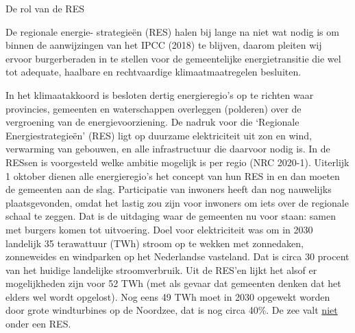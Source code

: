 \begin{voorstel}{De rol van de RES}

\begin{samenvatting}
De regionale energie- strategieën (RES) halen bij lange na niet wat nodig is om binnen de aanwijzingen van het IPCC (2018) te blijven, daarom pleiten wij ervoor burgerberaden in te stellen voor de gemeentelijke energietransitie die wel tot adequate, haalbare en rechtvaardige klimaatmaatregelen besluiten.
\end{samenvatting}

\begin{uitdaging}
In het klimaatakkoord is besloten dertig energieregio’s op te richten waar provincies, gemeenten en waterschappen overleggen (polderen) over de vergroening van de energievoorziening. De nadruk voor die ‘Regionale Energiestrategieën’ (RES) ligt op duurzame elektriciteit uit zon en wind, verwarming van gebouwen, en alle infrastructuur die daarvoor nodig is. In de RESsen is voorgesteld welke ambitie mogelijk is per regio (NRC 2020-1). Uiterlijk 1 oktober dienen alle energieregio’s het concept van hun RES in en dan moeten de gemeenten aan de slag. Participatie van inwoners heeft dan nog nauwelijks plaatsgevonden, omdat het lastig zou zijn voor inwoners om iets over de regionale schaal te zeggen. Dat is de uitdaging waar de gemeenten nu voor staan: samen met burgers komen tot uitvoering. 
Doel voor elektriciteit was om in 2030 landelijk 35 terawattuur (TWh) stroom op te wekken met zonnedaken, zonneweides en windparken op het Nederlandse vasteland. Dat is circa 30 procent van het huidige landelijke stroomverbruik. Uit de RES’en lijkt het alsof er mogelijkheden zijn voor 52 TWh (met als gevaar dat gemeenten denken dat het elders wel wordt opgelost).
Nog eens 49 TWh moet in 2030 opgewekt worden door grote windturbines op de Noordzee, dat is nog circa 40\%. De zee valt \underline{niet} onder een RES.


\end{uitdaging}
\end{voorstel}

